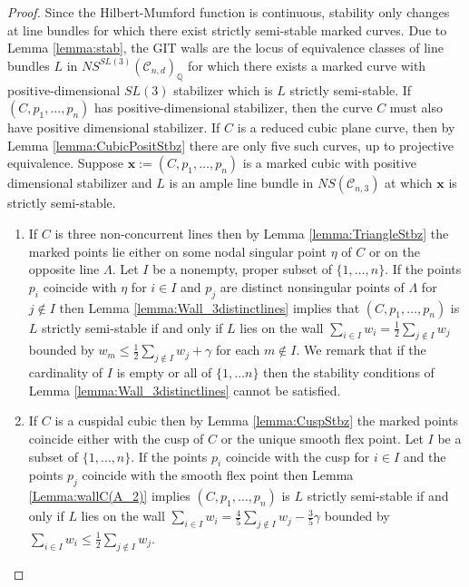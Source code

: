 \documentclass{amsart}
\newcommand{\Q}{\mathbb{Q}}
\newcommand{\mc}{\mathcal}
\numberwithin{equation}{section}
\theoremstyle{definition}
\begin{document}
\begin{proof}

Since the Hilbert-Mumford function is continuous, stability only changes at line bundles for which there exist strictly semi-stable marked curves. Due to Lemma \ref{lemma:stab}, the GIT walls are the locus of equivalence classes of line bundles $L$ in $NS^{SL(3)}(\mc{C}_{n,d})_\Q$ for which there exists a marked curve with positive-dimensional $SL(3)$ stabilizer which is $L$ strictly semi-stable. If $(C,p_1, \dots , p_n)$ has positive-dimensional stabilizer, then the curve $C$ must also have positive dimensional stabilizer. If $C$ is a reduced cubic plane curve, then by Lemma \ref{lemma:CubicPositStbz} there are only five such curves, up to projective equivalence. Suppose $\mathbf{x}:=(C, p_1, \dots , p_n)$ is a marked cubic with positive dimensional stabilizer and $L$ is an ample line bundle in $NS(\mc{C}_{n,3})$ at which $\mathbf{x}$ is strictly semi-stable.

\begin{enumerate}[label=(\roman*)]
    \item If $C$ is three non-concurrent lines then by Lemma \ref{lemma:TriangleStbz} the marked points lie either on some nodal singular point $\eta$ of $C$ or on the opposite line $\Lambda$. Let $I$ be a nonempty, proper subset of $\{1, \dots , n\}$. If the points $p_i$ coincide with $\eta$ for $i \in I$ and $p_j$ are distinct nonsingular points of $\Lambda$ for $j \notin I$ then Lemma \ref{lemma:Wall_3distinctlines} implies that $(C, p_1, \dots, p_n)$ is $L$ strictly semi-stable if and only if $L$ lies on the wall $\sum_{i \in I} w_i = \frac{1}{2} \sum_{j \notin I} w_j$ bounded by $ w_m \leq  \frac{1}{2} \sum_{j \notin I} w_j + \gamma$ for each $ m \notin I.$ We remark that if the cardinality of $I$ is empty or all of $\{1, \dots n\}$ then the stability conditions of Lemma \ref{lemma:Wall_3distinctlines} cannot be satisfied.

    \item If $C$ is a cuspidal cubic then by Lemma \ref{lemma:CuspStbz} the marked points coincide either with the cusp of $C$ or the unique smooth flex point. Let $I$ be a subset of $\{1, \dots , n\}$. If the points $p_i$ coincide with the cusp for $i \in I$ and the points $p_j$ coincide with the smooth flex point then Lemma \ref{Lemma:wallC(A_2)} implies $(C, p_1, \dots , p_n)$ is $L$ strictly semi-stable if and only if $L$ lies on the wall $\sum_{i \in I} w_i  = \frac{4}{5} \sum_{j \notin I} w_j  - \frac{3}{5}\gamma $ bounded by $ \sum_{i \in I} w_i \leq \frac{1}{2} \sum_{j \notin I} w_j.$ 


\end{enumerate}
\end{proof}
\end{document}
